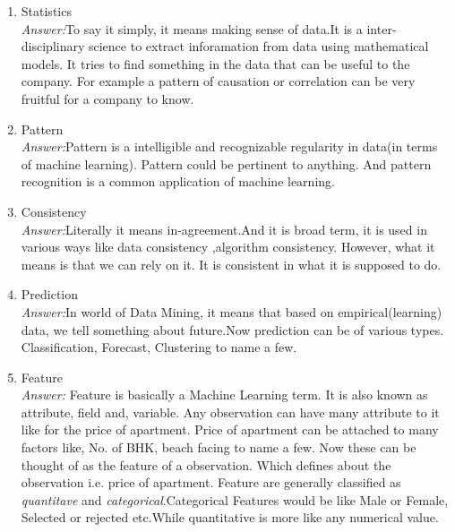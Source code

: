 \documentclass{article}
\begin{document}
\begin{enumerate}
\begin{enumerate}
			\item Statistics \\
			\emph{Answer:}To say it simply, it means making sense of data.It is a inter-disciplinary science to extract inforamation from data using mathematical models. It tries to find something in the data that can be useful to the company. For example a pattern of causation or correlation can be very fruitful for a company to know. 

			\item Pattern \\
			\emph{Answer:}Pattern is a intelligible and recognizable regularity in data(in terms of machine learning). Pattern could be pertinent to anything. And pattern recognition is a common application of machine learning. 

			\item Consistency \\
			\emph{Answer:}Literally it means in-agreement.And it is broad term, it is used in various ways like data consistency ,algorithm consistency. However, what it means is that we can rely on it. It is consistent in what it is supposed to do. 

			\item Prediction \\
			\emph{Answer:}In world of Data Mining, it means that based on empirical(learning) data, we tell something about future.Now prediction can be of various types. Classification, Forecast, Clustering to name a few.

			\item Feature \\
			\emph{Answer:} Feature is basically a Machine Learning term. It is also known as attribute, field and, variable. Any observation can have many attribute to it  like for the price of apartment. Price of apartment can be attached to many factors like, No. of BHK, beach facing to name a few. Now these can be thought of as the feature of a observation. Which defines about the observation i.e. price of apartment. Feature are generally classified as \emph{quantitave} and \emph{categorical}.Categorical Features would be like Male or Female, Selected or rejected etc.While quantitative is more like any numerical value.


\end{enumerate}
\end{enumerate}
\end{document}
